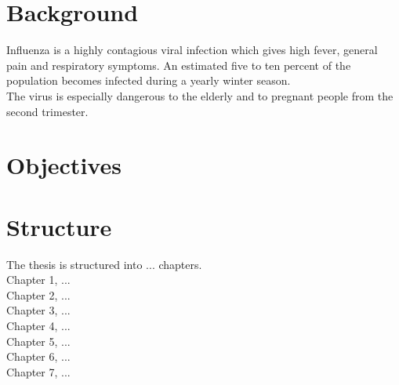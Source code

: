 \section{Background}
Influenza is a highly contagious viral infection which gives high fever, general pain and respiratory symptoms. An estimated five to ten percent of the population becomes infected during a yearly winter season.\\ The virus is especially dangerous to the elderly and to pregnant people from the second trimester.


\section{Objectives}

\section{Structure}
The thesis is structured into ... chapters.\\
Chapter 1, ...\\
Chapter 2, ...\\
Chapter 3, ...\\
Chapter 4, ...\\
Chapter 5, ...\\
Chapter 6, ...\\
Chapter 7, ...\\